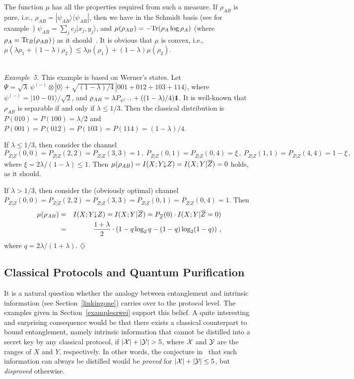 \documentclass{article}
\newcommand{\exend}{\hspace*{\fill} $\diamondsuit$}
\newcommand{\Tr}{{\rm Tr}}
\newcommand{\noi}{\noindent}
\newcommand{\OZ}{\overline{Z}}
\newcommand{\cx}{{\cal X}}
\newcommand{\cy}{{\cal Y}}
\newcommand{\ida}{I(X;Y\hspace{-1.3mm}\downarrow\hspace{-0.8mm} Z)}
\def\opone{\leavevmode\hbox{\small1\kern-3.8pt\normalsize1}}
\begin{document}
The function $\mu$ has all the properties required from such a measure.
If $\rho_{AB}$ is pure, i.e., $\rho_{AB}=|\psi_{AB}\rangle\langle\psi_{AB}|$, 
then we have  in the Schmidt
basis (see for example~\cite{Peresbook}) 
$\psi_{AB}=\sum_j c_j |x_j,y_j\rangle $, and
$\mu(\rho_{AB})=-\Tr(\rho_A\log\rho_A)$ (where 
$\rho_A=\Tr_B(\rho_{AB})$)
 as it should~\cite{qp9610044}.
It is obvious that $\mu$ is convex, i.e., 
$\mu(\lambda\rho_1+(1-\lambda)\rho_2)\le\lambda\mu(\rho_1)+(1-\lambda)\mu(
\rho_2)$.
\\ \

\noi
{\it Example~5.} 
This example is   based on Werner's states.
Let
$
\Psi=\sqrt{\lambda}\, \psi^{(-)}\otimes|0\rangle  +
\sqrt{(1-\lambda)/4}\, |001+012+103+114\rangle
$,
where $\psi^{(-)}=|10-01\rangle /\sqrt{2}$, and $\rho_{AB}=\lambda P_{\psi^{(-)}} +
((1-\lambda)/4)\opone$.
It is well-known that $\rho_{AB}$ is separable if and only if 
 $\lambda\le 1/3$.
Then the classical distribution is $P(010)=P(100)=\lambda/2$ and 
$P(001)=P(012)=P(103)=P(114)=(1-\lambda)/4$.




If $\lambda\le1/3$, then consider the channel
$P_{\OZ|Z}( 0,0)=
P_{\OZ|Z}(  2,2)=
P_{\OZ|Z}(  3,3)=1\, ,\ 
P_{\OZ|Z}(  0,1)=
P_{\OZ|Z}(  0,4)=\xi\, ,\ 
P_{\OZ|Z}(  1,1)=
P_{\OZ|Z}(  4,4)=1-\xi\, ,
$ 
where $\xi=2\lambda/(1-\lambda)\le 1$. 
Then  $\mu(\rho_{AB})=\ida=I(X;Y|\OZ)=0$ holds, as it should.

If $\lambda>1/3$, then consider the (obviously optimal) channel
$P_{\OZ|Z}(  0,0)=
P_{\OZ|Z}(  2,2)=
P_{\OZ|Z}(  3,3)=
P_{\OZ|Z}(  0,1)=
P_{\OZ|Z}(  0,4)=1
$.
Then
\begin{eqnarray*}
\mu(\rho_{AB}) & = & \ida=I(X;Y|\OZ)=P_{\OZ}(0)\cdot I(X;Y|\OZ=0)\\
& = & \frac{1+\lambda}{2}\cdot 
(1-q\log_2 q-(1-q)\log_2(1-q))\ ,
\end{eqnarray*}
where $q=2\lambda/(1+\lambda)$.
\exend


  \subsection{Classical Protocols and Quantum Purification}\label{prot}

It is a natural question  whether the analogy between entanglement and
intrinsic information (see Section~\ref{linkingone}) carries over to the 
protocol level. The examples given in Section~\ref{exampleszwei} support this 
belief.
A quite interesting and surprising consequence 
 would be that there exists a classical counterpart to bound 
entanglement, namely intrinsic information that cannot be distilled 
into a secret key by any classical protocol, if $|\cx|+|\cy|> 5$,
where $\cx$ and $\cy$ are the ranges of $X$ and $Y$, respectively.
In other words, the conjecture in~\cite{ittrans}  that such
information can always be distilled would be {\em proved\/} for 
$|\cx|+|\cy|\leq 5$, but {\em disproved\/} otherwise. 
\end{document}
